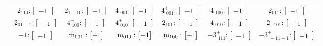 \documentclass[fleqn,8pt,landscape]{jsarticle}
\begin{document}
\begin{longtable}{ccccccc}
& $ 2{}_{110}:\begin{bmatrix} -1 \end{bmatrix} $ & $ 2{}_{1-10}:\begin{bmatrix} -1 \end{bmatrix} $ & $ 4^{-}_{\,\,001}:\begin{bmatrix} -1 \end{bmatrix} $ & $ 4^{+}_{\,\,001}:\begin{bmatrix} -1 \end{bmatrix} $ & $ 4^{-}_{\,\,100}:\begin{bmatrix} -1 \end{bmatrix} $ & $ 2{}_{011}:\begin{bmatrix} -1 \end{bmatrix} $ \\
& $ 2{}_{01-1}:\begin{bmatrix} -1 \end{bmatrix} $ & $ 4^{+}_{\,\,100}:\begin{bmatrix} -1 \end{bmatrix} $ & $ 4^{+}_{\,\,010}:\begin{bmatrix} -1 \end{bmatrix} $ & $ 2{}_{101}:\begin{bmatrix} -1 \end{bmatrix} $ & $ 4^{-}_{\,\,010}:\begin{bmatrix} -1 \end{bmatrix} $ & $ 2{}_{-101}:\begin{bmatrix} -1 \end{bmatrix} $ \\
& $ -1:\begin{bmatrix} -1 \end{bmatrix} $ & $ {\rm m}_{001}:\begin{bmatrix} -1 \end{bmatrix} $ & $ {\rm m}_{010}:\begin{bmatrix} -1 \end{bmatrix} $ & $ {\rm m}_{100}:\begin{bmatrix} -1 \end{bmatrix} $ & $ -3^{+}_{\,\,111}:\begin{bmatrix} -1 \end{bmatrix} $ & $ -3^{+}_{\,\,-11-1}:\begin{bmatrix} -1 \end{bmatrix} $ \\

\end{longtable}
\end{document}
